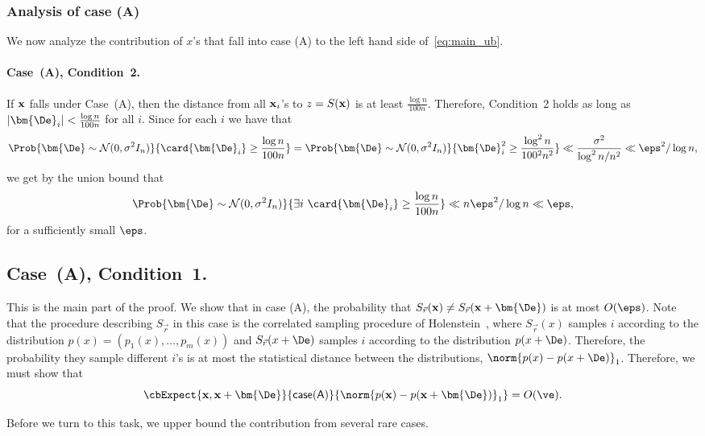 \subsubsection{Analysis of case (A)}
We now analyze the contribution of $x$'s that fall into case (A) to the left hand side of~\eqref{eq:main_ub}.
\paragraph{Case~(A), Condition~2.}  If  ${\bf x}$  falls under Case~(A),
then the distance from all ${\bf x}_i$'s to $z=S({\bf x})$ is at least $\frac{\log n}{100 n}$.
Therefore, Condition~2 holds as long as $|\bm{\De}_i| < \frac{\log n}{100 n}$ for all $i$.
Since for each $i$ we have that
\[
\Prob{\bm{\De}\sim\mathcal{N}(0,\sigma^2 I_n)}{\card{\bm{\De}_i}\geq \frac{\log n}{100 n}}
=
\Prob{\bm{\De}\sim\mathcal{N}(0,\sigma^2 I_n)}{\bm{\De}_i^2\geq \frac{\log^2 n}{100^2 n^2}}
\ll \frac{\sigma^2}{\log ^2 n/n^2}
\ll \eps^2/\log n,
\]
we get by the union bound that
\[
\Prob{\bm{\De}\sim\mathcal{N}(0,\sigma^2 I_n)}{\exists i~\card{\bm{\De}_i}\geq \frac{\log n}{100 n}}
\ll n\eps^2/\log n
\ll \eps,
\]
for a sufficiently small $\eps$.


\subsection{Case~(A), Condition~1.}
This is the main part of the proof.
We show that in case (A), the probability that $S_{\vec{r}}({\bf x})\neq S_{\vec{r}}({\bf x}+\bm{\De})$
is at most $O(\eps)$. Note that the procedure describing $S_{\vec{r}}$ in this case
is the correlated sampling  procedure of Holenstein~\cite{Holenstein}, where
$S_{\vec{r}}(x)$ samples $i$ according to
the distribution $p(x) = (p_1(x),\ldots, p_m(x))$ and
$S_{\vec{r}}(x+\De)$ samples $i$ according to the distribution $p(x+\De)$. Therefore,
the probability they sample different $i$'s is at most the statistical distance
between the distributions, $\norm{p(x) - p(x+\De)}_1$. Therefore, we must show that
\begin{equation}\label{eq:mainA1}
\cbExpect{{\bf x},{\bf x}+\bm{\De}}{{\sf case (A)}}{\norm{p({\bf x}) - p({\bf x}+\bm{\De})}_1} = O(\ve).
\end{equation}

Before we turn to this task, we upper bound the contribution from several rare cases.

